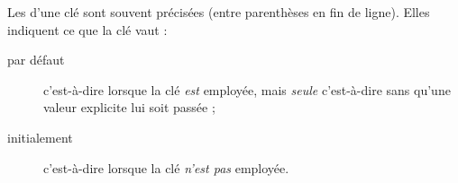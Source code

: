 \documentclass[french,nolocaltoc]{nwejmart}
\newtheorem[style=definition]{fait}
\newtheorem[title=contraventionnalisation]{ctrv}
\newtheorem[title-plural=anneaux]{anneau}
\newtheorem[title-plural=idéaux]{idéal}
\begin{document}
Les  d'une clé sont souvent précisées
(entre parenthèses en fin de ligne). Elles indiquent ce que la clé vaut :
\begin{description}
\item[par défaut] c'est-à-dire lorsque la clé \emph{est} employée, mais
  \emph{seule} c'est-à-dire sans qu'une valeur explicite lui soit passée ;
\item[initialement] c'est-à-dire lorsque la clé \emph{n'est pas} employée.
\end{description}
%
\printbibliography[category=documentation]
%
%
\printindex
\end{document}
